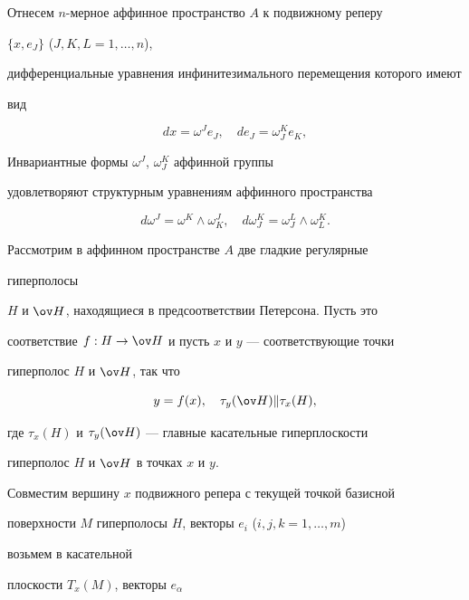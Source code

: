  


Отнесем $n$-мерное аффинное пространство $A$ к подвижному реперу 


$\{x,e_J\}$ ($J,K,L=1,\dotsc,n$),


дифференциальные уравнения инфинитезимального перемещения которого имеют 


вид 


\begin{equation} 


dx=\omega^J e_J,\quad de_J=\omega^K_J e_K, 


\end{equation} 


Инвариантные формы $\omega^J$, $\omega^K_J$ аффинной группы 


удовлетворяют структурным уравнениям аффинного пространства 


\begin{equation} 


d\omega^J=\omega^K\wedge\omega^J_K,\quad 


d\omega^K_J=\omega^L_J\wedge\omega^K_L. 


\end{equation} 


 


Рассмотрим в аффинном пространстве $A$ две гладкие регулярные 


гиперполосы 


$H$ и $\ov H$, находящиеся в предсоответствии Петерсона. Пусть это 


соответствие $f:H\to\ov H$ и пусть $x$ и $y$ --- соответствующие точки 


гиперполос $H$ и $\ov H$, так что 


$$ 


y=f(x),\quad \tau_y(\ov H)\Vert\tau_x(H), 


$$ 


где $\tau_x(H)$ и $\tau_y(\ov H)$ --- главные касательные гиперплоскости 


гиперполос $H$ и $\ov H$ в точках $x$ и $y$. 


 


Совместим вершину $x$ подвижного репера с текущей точкой базисной 


поверхности $M$ гиперполосы $H$, векторы $e_i$ ($i,j,k=1,\dotsc,m$) 


возьмем в касательной 


плоскости $T_x(M)$, векторы $e_\alpha$ 


